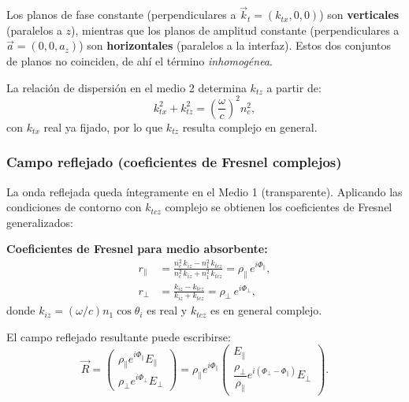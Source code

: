 \documentclass[12pt, a4paper]{article}
\theoremstyle{plain}
\theoremstyle{definition}
\theoremstyle{remark}
\newcommand{\ve}[1]{\vec{#1}}
\begin{document}
Los planos de fase constante (perpendiculares a $\ve{k}_t = (k_{tx}, 0, 0)$)
son \textbf{verticales} (paralelos a $z$), mientras que los planos de
amplitud constante (perpendiculares a $\ve{a} = (0, 0, a_z)$) son
\textbf{horizontales} (paralelos a la interfaz). Estos dos conjuntos de
planos no coinciden, de ahí el término \emph{inhomogénea}.

La relación de dispersión en el medio 2 determina $k_{tz}$ a partir de:
\[
  k_{tx}^2 + k_{tz}^2 = \left(\frac{\omega}{c}\right)^2 n_c^2,
\]
con $k_{tx}$ real ya fijado, por lo que $k_{tz}$ resulta complejo en general.

\subsubsection{Campo reflejado (coeficientes de Fresnel complejos)}

La onda reflejada queda íntegramente en el Medio 1 (transparente). Aplicando
las condiciones de contorno con $k_{tcz}$ complejo se obtienen los
coeficientes de Fresnel generalizados:

\begin{mdframed}[style=resultado]
\textbf{Coeficientes de Fresnel para medio absorbente:}
\begin{align}
  r_\parallel &= \frac{n_c^2\, k_{iz} - n_1^2\, k_{tcz}}
                     {n_c^2\, k_{iz} + n_1^2\, k_{tcz}}
               = \rho_\parallel\, e^{i\Phi_\parallel},
  \label{eq:rp_metal} \\
  r_\perp     &= \frac{k_{iz} - k_{tcz}}
                     {k_{iz} + k_{tcz}}
               = \rho_\perp\, e^{i\Phi_\perp},
  \label{eq:rs_metal}
\end{align}
donde $k_{iz} = (\omega/c)n_1\cos\theta_i$ es real y
$k_{tcz}$ es en general complejo.
\end{mdframed}

El campo reflejado resultante puede escribirse:
\[
  \ve{R} = \begin{pmatrix} \rho_\parallel e^{i\Phi_\parallel} E_\parallel \\[4pt]
                            \rho_\perp e^{i\Phi_\perp} E_\perp \end{pmatrix}
         = \rho_\parallel e^{i\Phi_\parallel}
           \begin{pmatrix} E_\parallel \\[4pt]
                           \dfrac{\rho_\perp}{\rho_\parallel}
                           e^{i(\Phi_\perp - \Phi_\parallel)} E_\perp
           \end{pmatrix}.
\]
\end{document}
